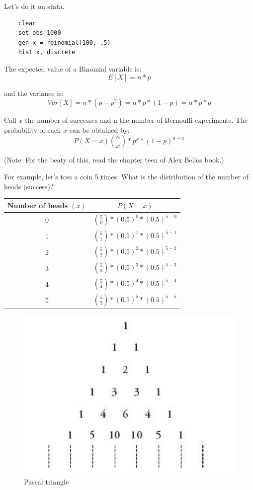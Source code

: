 \documentclass[11pt]{article}
\begin{document}
	Let's do it on stata.\\

	\begin{verbatim}
	clear
	set obs 1000
	gen x = rbinomial(100, .5)
	hist x, discrete
	\end{verbatim}

	The expected value of a Binomial variable is:
		\[E[X] = n*p\]
		
	and the variance is:
		\[Var[X]=n*(p-p^2)= n*p*(1-p) = n*p*q\]

	Call $x$ the number of successes and n the number of Bernoulli experiments. The probability of each $x$ can be obtained by:
		\[P(X=x)\binom{n}{x} * p^x * (1-p)^{n-x}\]
		
		(Note: For the beaty of this, read the chapter teen of Alex Bellos book.)	

	For example, let's toss a coin 5 times. What is the distribution of the number of heads (success)?\newline\\
		\begin{tabular}{|c|c|}
\hline
	Number of heads $(x)$ & $P(X=x)$\\
\hline
0 & $\binom{5}{0} * (0.5)^0 * (0.5)^{5-0}$\\
1 & $\binom{5}{1} * (0.5)^1 * (0.5)^{5-1}$\\
2 & $\binom{5}{2} * (0.5)^2 * (0.5)^{5-2}$\\
3 & $\binom{5}{3} * (0.5)^3 * (0.5)^{5-3}$\\
4 & $\binom{5}{4} * (0.5)^4 * (0.5)^{5-4}$\\
5 & $\binom{5}{5} * (0.5)^5 * (0.5)^{5-5}$\\
\hline
\end{tabular}


\begin{figure}[htp]
\centering
\includegraphics[scale=0.5]{pascal.png}
\caption{Pascal triangle}
\label{}
\end{figure}
\end{document}
